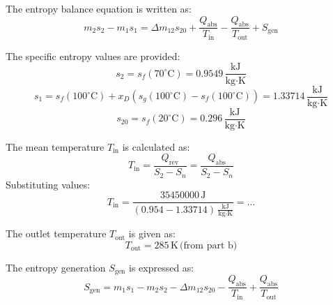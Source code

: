 The entropy balance equation is written as:  
\[
m_2 s_2 - m_1 s_1 = \Delta m_{12} s_{20} + \frac{Q_{\text{abs}}}{T_{\text{in}}} - \frac{Q_{\text{abs}}}{T_{\text{out}}} + S_{\text{gen}}
\]  

The specific entropy values are provided:  
\[
s_2 = s_f(70^\circ\text{C}) = 0.9549 \, \frac{\text{kJ}}{\text{kg·K}}
\]  
\[
s_1 = s_f(100^\circ\text{C}) + x_D \left( s_g(100^\circ\text{C}) - s_f(100^\circ\text{C}) \right) = 1.33714 \, \frac{\text{kJ}}{\text{kg·K}}
\]  
\[
s_{20} = s_f(20^\circ\text{C}) = 0.296 \, \frac{\text{kJ}}{\text{kg·K}}
\]  

The mean temperature \( T_{\text{in}} \) is calculated as:  
\[
T_{\text{in}} = \frac{Q_{\text{rev}}}{S_2 - S_n} = \frac{Q_{\text{abs}}}{S_2 - S_n}
\]  
Substituting values:  
\[
T_{\text{in}} = \frac{35450000 \, \text{J}}{(0.954 - 1.33714) \, \frac{\text{kJ}}{\text{kg·K}}} = \dots
\]  

The outlet temperature \( T_{\text{out}} \) is given as:  
\[
T_{\text{out}} = 285 \, \text{K} \, \text{(from part b)}
\]  

The entropy generation \( S_{\text{gen}} \) is expressed as:  
\[
S_{\text{gen}} = m_1 s_1 - m_2 s_2 - \Delta m_{12} s_{20} - \frac{Q_{\text{abs}}}{T_{\text{in}}} + \frac{Q_{\text{abs}}}{T_{\text{out}}}
\]